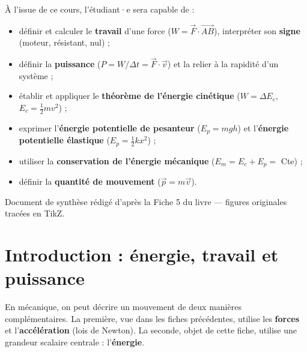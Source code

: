 \documentclass[11pt,a4paper]{article}
\newcommand{\vv}[1]{\vec{#1}}
\begin{document}
\begin{tcolorbox}[boxbase,colback=primary!5,colframe=primary,width=15cm,
    title={\textsc{Objectifs pédagogiques de la fiche}}]
À l'issue de ce cours, l'étudiant·e sera capable de :
\begin{itemize}[leftmargin=1.6em,topsep=2pt,itemsep=1pt]
  \item définir et calculer le \textbf{travail} d'une force ($W=\vv F\cdot\vv{AB}$), interpréter son \textbf{signe} (moteur, résistant, nul) ;
  \item définir la \textbf{puissance} ($P=W/\Delta t=\vv F\cdot\vv v$) et la relier à la rapidité d'un système ;
  \item établir et appliquer le \textbf{théorème de l'énergie cinétique} ($W=\Delta E_c$, $E_c=\tfrac12 mv^2$) ;
  \item exprimer l'\textbf{énergie potentielle de pesanteur} ($E_p=mgh$) et l'\textbf{énergie potentielle élastique} ($E_p=\tfrac12 kx^2$) ;
  \item utiliser la \textbf{conservation de l'énergie mécanique} ($E_m=E_c+E_p=$ Cte) ;
  \item définir la \textbf{quantité de mouvement} ($\vv p=m\vv v$).
\end{itemize}
\end{tcolorbox}

\vspace{0.4cm}
{\small\color{black!60} Document de synthèse rédigé d'après la Fiche 5 du livre — figures originales tracées en TikZ.}
\par
\endgroup

\newpage
\renewcommand{\contentsname}{\textcolor{primarydark}{Table des matières}}
\tableofcontents
\thispagestyle{fancy}
\newpage

\section{Introduction : énergie, travail et puissance}
En mécanique, on peut décrire un mouvement de deux manières complémentaires. La première, vue
dans les fiches précédentes, utilise les \textbf{forces} et l'\textbf{accélération} (lois de Newton).
La seconde, objet de cette fiche, utilise une grandeur scalaire centrale : l'\textbf{énergie}.
\end{document}
